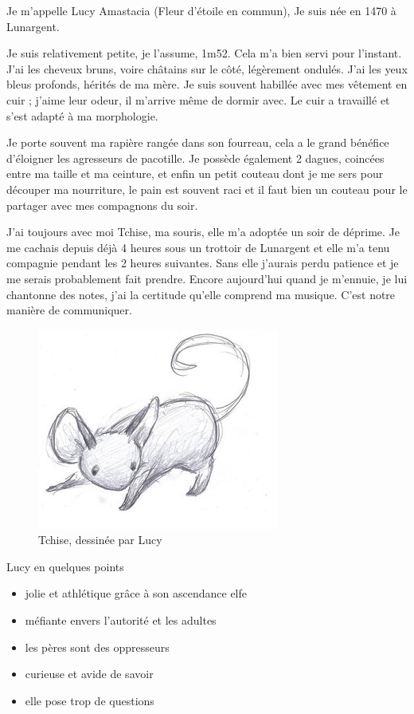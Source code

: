 \documentclass[10pt,a4paper,twoside,twocolumn,openany]{book}
\begin{document}
Je m'appelle Lucy Amastacia (Fleur d'étoile en commun), Je suis née en 1470 à Lunargent.

Je suis relativement petite, je l'assume, 1m52. Cela m'a bien servi
pour l'instant. J'ai les cheveux bruns, voire châtains sur le côté, légèrement
ondulés. J'ai les yeux bleus profonds, hérités de ma mère.
Je suis souvent habillée avec mes vêtement en cuir ; j'aime leur odeur, il m'arrive
même de dormir avec. Le cuir a travaillé et s'est adapté à ma morphologie.

Je porte souvent ma rapière rangée dans son fourreau, cela a le grand bénéfice d'éloigner
les agresseurs de pacotille. Je possède également 2 dagues, coincées
entre ma taille et ma ceinture, et enfin un petit couteau dont je me sers pour
découper ma nourriture, le pain est souvent raci et il faut bien un couteau pour le partager
avec mes compagnons du soir.

J'ai toujours avec moi Tchise, ma souris, elle m'a adoptée un soir de déprime. Je me cachais
depuis déjà 4 heures sous un trottoir de Lunargent et elle m'a tenu compagnie pendant
les 2 heures suivantes. Sans elle j'aurais perdu patience et je me serais probablement
fait prendre. Encore aujourd'hui quand je m'ennuie, je lui chantonne des notes, j'ai la
certitude qu'elle comprend ma musique. C'est notre manière de communiquer.

\begin{figure}[!h]
\centering
\includegraphics[scale=1]{tchise.png}
\caption*{Tchise, dessinée par Lucy}
\end{figure}

\begin{commentbox}{Lucy en quelques points}

\begin{itemize}
\item jolie et athlétique grâce à son ascendance elfe
\item méfiante envers l'autorité et les adultes
\item les pères sont des oppresseurs
\item curieuse et avide de savoir
\item elle pose trop de questions
\end{itemize}

\end{commentbox}
\end{document}
